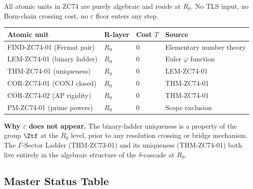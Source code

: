 \documentclass[12pt, a4paper]{article}
\begin{document}
\begin{layerbox}[title={R-Layer Assignments for ZC74}]

All atomic units in ZC74 are purely algebraic and reside at $R_0$.
No TLS input, no Born-chain crossing cost, no $\varepsilon$ floor
enters any step.

\medskip
{\small\renewcommand{\arraystretch}{1.25}
\begin{center}
\begin{tabular}{@{}llll@{}}
\toprule
Atomic unit & R-layer & Cost $T$ & Source \\
\midrule
FIND-ZC74-01 (Fermat pair) & $R_0$ & $0$ & Elementary number theory \\
LEM-ZC74-01 (binary ladder) & $R_0$ & $0$ & Euler $\varphi$ function \\
THM-ZC74-01 (uniqueness) & $R_0$ & $0$ & LEM-ZC74-01 \\
COR-ZC74-01 (CONJ closed) & $R_0$ & $0$ & THM-ZC74-01 \\
COR-ZC74-02 (AP rigidity) & $R_0$ & $0$ & THM-ZC74-01 \\
PM-ZC74-01 (prime powers) & $R_0$ & $0$ & Scope exclusion \\
\bottomrule
\end{tabular}
\end{center}}

\textbf{Why $\varepsilon$ does not appear.}
The binary-ladder uniqueness is a property of the group $\Ztf$
at the $R_0$ level, prior to any resolution crossing or bridge
mechanism. The $\Gamma$-Sector Ladder (THM-ZC73-01) and its
uniqueness (THM-ZC74-01) both live entirely in the algebraic
structure of the $\delta$-cascade at $R_0$.
\end{layerbox}

\subsection{Master Status Table}
\label{sec:status}
\end{document}
